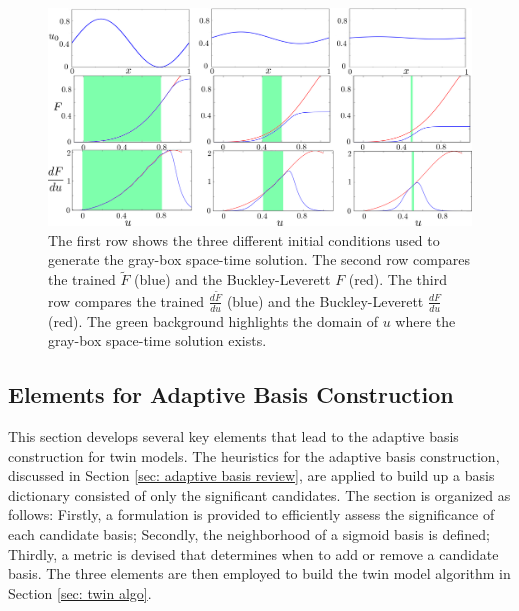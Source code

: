 \begin{figure}[htbp]
\begin{center}
    \includegraphics[width=13cm]{../combine_3_inits.png}
    \caption{The first row shows the three different initial conditions used to generate
             the gray-box space-time solution. The second row compares the trained $\tilde{F}$ 
             (blue) and the Buckley-Leverett $F$ (red). The third row compares
             the trained $\frac{d\tilde{F}}{du}$ (blue) and the Buckley-Leverett 
             $\frac{dF}{du}$ (red). The green background highlights the domain of $u$ where
             the gray-box space-time solution exists.}
    \label{fig: combine 3}
\end{center}
\end{figure}


\subsection{Elements for Adaptive Basis Construction}
\label{sec: adaptive basis}
This section develops several key 
elements that lead to the adaptive basis construction for twin models.
The heuristics for the adaptive basis construction, discussed in Section
\ref{sec: adaptive basis review}, are applied to build up a basis dictionary consisted of
only the significant candidates. The section is organized as follows:
Firstly, a formulation is provided to efficiently assess the 
significance of each candidate basis; Secondly, 
the neighborhood of a sigmoid basis is defined;
Thirdly, a metric is devised that determines when to add or remove a candidate basis.
The three elements are then employed to build the twin model algorithm in Section \ref{sec: twin algo}.\\

